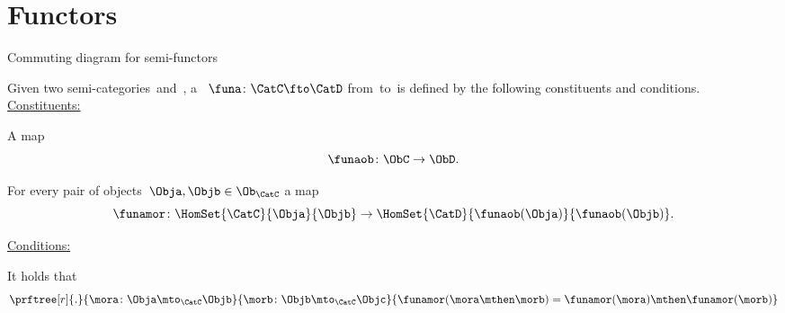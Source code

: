 
\section{Functors}

\begin{marginfigure}
    \centering
    \caption{Commuting diagram for semi-functors}
    \label{fig:functor_detail}
\end{marginfigure}

\begin{ctdefinition}
    \label{def:semi-functor}
    Given two semi-categories~\CatC and~\CatD, a \emph{}~$\funa\colon \CatC\fto \CatD$ from~\CatC to~\CatD is defined by the following constituents and conditions. \\
    \underline{Constituents:}
    \begin{compactenum}
        [i)]
        \item A map
        \begin{equation}
            \funaob\colon \ObC \to \ObD.
        \end{equation}
        \item For every pair of objects~$\Obja, \Objb\in \Ob_\CatC$ a map
        \begin{equation}
            \funamor\colon \HomSet{\CatC}{\Obja}{\Objb} \to \HomSet{\CatD}{\funaob(\Obja)}{\funaob(\Objb)}.
        \end{equation}
    \end{compactenum}
    \underline{Conditions:}
    \begin{compactenum}
        \item It holds that
        \begin{equation}
            \prftree[r]{.}{\mora\colon \Obja \mto_{\CatC} \Objb}{\morb\colon \Objb \mto_{\CatC} \Objc}{
                \funamor(\mora \mthen \morb)=\funamor(\mora)\mthen \funamor(\morb)
            }
        \end{equation}
    \end{compactenum}
\end{ctdefinition}

